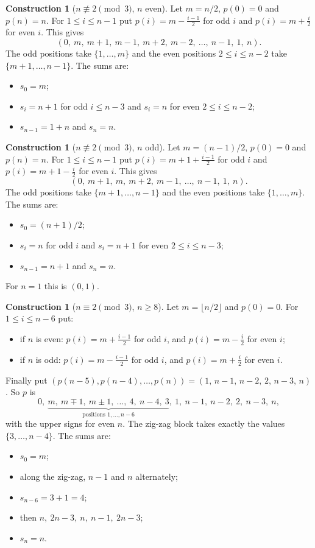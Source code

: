 \documentclass[11pt]{article}
\numberwithin{equation}{section}
\theoremstyle{definition}
\newtheorem{construction}[theorem]{Construction}
\theoremstyle{remark}
\begin{document}
\begin{construction}[$n\not\equiv2\pmod3$, $n$ even]\label{con:C1}
Let $m=n/2$, $p(0)=0$ and $p(n)=n$. For $1\le i\le n-1$ put
$p(i)=m-\tfrac{i-1}{2}$ for odd $i$ and $p(i)=m+\tfrac i2$ for even $i$. This gives
\[
(0,\ m,\ m+1,\ m-1,\ m+2,\ m-2,\ \dots,\ n-1,\ 1,\ n).
\]
The odd positions take $\{1,\dots,m\}$ and the even positions $2\le i\le n-2$ take
$\{m+1,\dots,n-1\}$. The sums are:
\begin{itemize}
  \item $s_0=m$;
  \item $s_i=n+1$ for odd $i\le n-3$ and $s_i=n$ for even $2\le i\le n-2$;
  \item $s_{n-1}=1+n$ and $s_n=n$.
\end{itemize}
\end{construction}

\begin{construction}[$n\not\equiv2\pmod3$, $n$ odd]\label{con:C2}
Let $m=(n-1)/2$, $p(0)=0$ and $p(n)=n$. For $1\le i\le n-1$ put
$p(i)=m+1+\tfrac{i-1}2$ for odd $i$ and $p(i)=m+1-\tfrac i2$ for even $i$. This gives
\[
(0,\ m+1,\ m,\ m+2,\ m-1,\ \dots,\ n-1,\ 1,\ n).
\]
The odd positions take $\{m+1,\dots,n-1\}$ and the even positions take $\{1,\dots,m\}$. The sums are:
\begin{itemize}
  \item $s_0=(n+1)/2$;
  \item $s_i=n$ for odd $i$ and $s_i=n+1$ for even $2\le i\le n-3$;
  \item $s_{n-1}=n+1$ and $s_n=n$.
\end{itemize}
For $n=1$ this is $(0,1)$.
\end{construction}

\begin{construction}[$n\equiv2\pmod3$, $n\ge8$]\label{con:C3}
Let $m=\lfloor n/2\rfloor$ and $p(0)=0$. For $1\le i\le n-6$ put:
\begin{itemize}
  \item if $n$ is even: $p(i)=m+\tfrac{i-1}2$ for odd $i$, and $p(i)=m-\tfrac i2$ for even $i$;
  \item if $n$ is odd: $p(i)=m-\tfrac{i-1}2$ for odd $i$, and $p(i)=m+\tfrac i2$ for even $i$.
\end{itemize}
Finally put $(p(n-5),p(n-4),\dots,p(n))=(1,\,n-1,\,n-2,\,2,\,n-3,\,n)$. So $p$ is
\[
0,\ \underbrace{m,\ m\mp1,\ m\pm1,\ \dots,\ 4,\ n-4,\ 3}_{\text{positions }1,\dots,n-6},\ 1,\ n-1,\ n-2,\ 2,\ n-3,\ n,
\]
with the upper signs for even $n$. The zig-zag block takes exactly the values $\{3,\dots,n-4\}$. The sums are:
\begin{itemize}
  \item $s_0=m$;
  \item along the zig-zag, $n-1$ and $n$ alternately;
  \item $s_{n-6}=3+1=4$;
  \item then $n,\ 2n-3,\ n,\ n-1,\ 2n-3$;
  \item $s_n=n$.
\end{itemize}
\end{construction}
\end{document}
